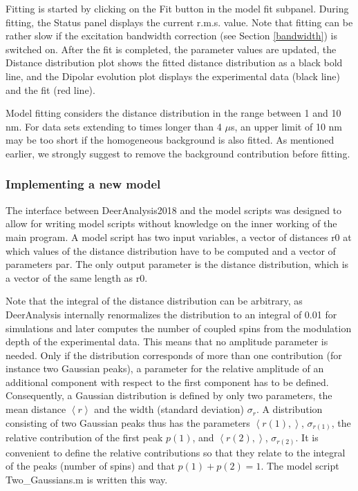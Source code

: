 \documentclass{article}
\begin{document}
Fitting is started by clicking on the {\ttfamily Fit} button in the {\ttfamily model fit} subpanel. During fitting, the {\ttfamily Status} panel displays the current r.m.s. value. Note that fitting can be rather slow if the excitation bandwidth correction (see Section \ref{bandwidth}) is switched on. After the fit is completed, the parameter values are updated, the {\ttfamily Distance distribution} plot shows the fitted distance distribution as a black bold line, and the {\ttfamily Dipolar evolution} plot displays the experimental data (black line) and the fit (red line).   

Model fitting considers the distance distribution in the range between 1 and 10 nm. For data sets extending to times longer than 4 $\mu$s, an upper limit of 10 nm may be too short if the homogeneous background is also fitted. As mentioned earlier, we strongly suggest to remove the background contribution before fitting.  
   
\subsubsection{Implementing a new model}
\label{new_model}   
The interface between DeerAnalysis2018 and the model scripts was designed to allow for writing model scripts without knowledge on the inner working of the main program. A model script has two input variables, a vector of distances {\ttfamily r0} at which values of the distance distribution have to be computed and a vector of parameters {\ttfamily par}. The only output parameter is the distance distribution, which is a vector of the same length as {\ttfamily r0}. 

Note that the integral of the distance distribution can be arbitrary, as DeerAnalysis internally renormalizes the distribution to an integral of 0.01 for simulations and later computes the number of coupled spins from the modulation depth of the experimental data. This means that no amplitude parameter is needed. Only if the distribution corresponds of more than one contribution (for instance two Gaussian peaks), a parameter for the relative amplitude of an additional component with respect to the first component has to be defined. Consequently, a Gaussian distribution is defined by only two parameters, the mean distance $\left\langle r \right\rangle$ and the width (standard deviation) $\sigma_r$. A distribution consisting of two Gaussian peaks thus has the parameters $\left\langle r(1), \right\rangle$, $\sigma_{r(1)}$, the relative contribution of the first peak $p(1)$, and $\left\langle r(2), \right\rangle$, $\sigma_{r(2)}$. It is convenient to define the relative contributions so that they relate to the integral of the peaks (number of spins) and that $p(1)+p(2)=1$. The model script {\ttfamily Two\_Gaussians.m} is written this way.
\end{document}
